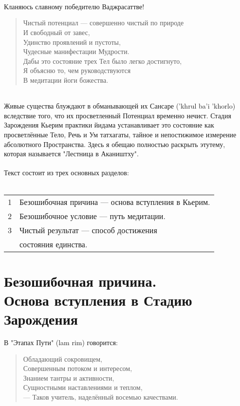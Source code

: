 \section*{}
\\
Кланяюсь славному победителю Ваджрасаттве!

\begin{verse}
Чистый потенциал — совершенно чистый по природе\\
И свобод\-ный от завес,\\
Удинство проявлений и пустоты,\\
Чудесные мани\-фестации Мудрости.\\
Дабы это состояние трех Тел было легко достигнуто,\\
Я объясню то, чем руководствуются\\
В медитации йоги божества.\\
\end{verse}
\\
Живые существа блуждают в обманывающей их Сансаре ('khrul ba'i 'khorlo)
вследствие того, что их просветленный Потенциал временно нечист.
Стадия Зарождения Кьерим практики йидама устанавливает это
состояние как просветлённые Тело, Речь и Ум татхагаты, тайное
и непостижимое измерение абсолютного Пространства. Здесь я
обещаю полностью раскрыть этутему, которая называется
"Лестница в Акаништху".\\
\\
Текст состоит из трех основных разделов:\\
\\
\begin{tabular}{ll}
1 & Безошибочная причина — основа вступления в Кьерим.\\
2 & Безошибочное условие — путь медитации.\\
3 & Чистый результат — способ достижения \\
  & состояния единства.\\
\end{tabular}
\newpage
\section{Безошибочная причина.\\Основа вступления в Стадию Зарождения}

\vspace{1cm}
В "Этапах Пути" (lam rim) говорится:

\begin{verse}
Обладающий сокровищем,\\
Совершенным потоком и интересом,\\
Знанием тантры и активности,\\
Сущностными наставлениями и теплом,\\
— Таков учитель, наделённый восемью качествами.
\end{verse}

